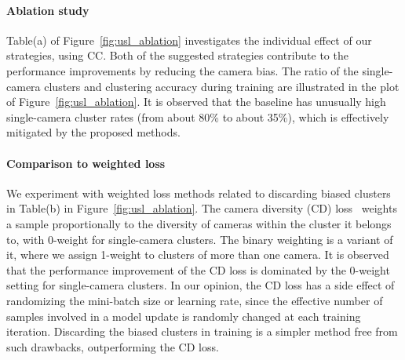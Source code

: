 \paragraph{Ablation study}
Table(a) of Figure~\ref{fig:usl_ablation} investigates the individual effect of our strategies, using CC.
Both of the suggested strategies contribute to the performance improvements by reducing the camera bias.
The ratio of the single-camera clusters and clustering accuracy during training are illustrated in the plot of Figure~\ref{fig:usl_ablation}.
It is observed that the baseline has unusually high single-camera cluster rates (from about 80\% to about 35\%), which is effectively mitigated by the proposed methods.


 
\paragraph{Comparison to weighted loss}
We experiment with weighted loss methods related to discarding biased clusters in Table(b) in Figure~\ref{fig:usl_ablation}.
The camera diversity (CD) loss~\citep{lee2023camera} weights a sample proportionally to the diversity of cameras within the cluster it belongs to, with 0-weight for single-camera clusters.
The binary weighting is a variant of it, where we assign 1-weight to clusters of more than one camera.
It is observed that the performance improvement of the CD loss is dominated by the 0-weight setting for single-camera clusters.
In our opinion, the CD loss has a side effect of randomizing the mini-batch size or learning rate, since the effective number of samples involved in a model update is randomly changed at each training iteration.
Discarding the biased clusters in training is a simpler method free from such drawbacks, outperforming the CD loss.





